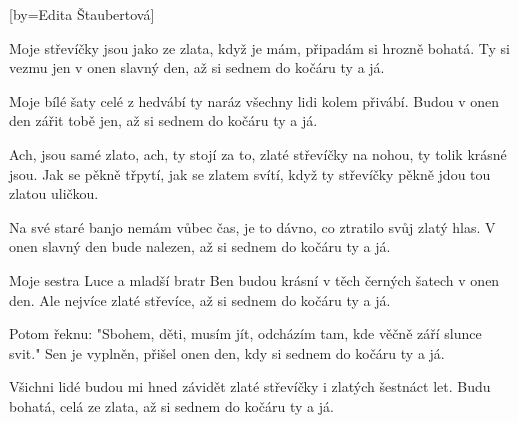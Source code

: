 [by={Edita Štaubertová}]

\beginverse{}
Moje střevíčky jsou jako ze zlata,
když je mám, připadám si hrozně bohatá.
Ty si vezmu jen v onen slavný den,
až si sednem do kočáru ty a já.
\endverse{}

\beginverse{}
Moje bílé šaty celé z hedvábí
ty naráz všechny lidi kolem přivábí.
Budou v onen den zářit tobě jen,
až si sednem do kočáru ty a já.
\endverse{}

\beginchorus{}
Ach, jsou samé zlato, ach, ty stojí za to,
zlaté střevíčky na nohou, ty tolik krásné jsou.
Jak se pěkně třpytí, jak se zlatem svítí,
když ty střevíčky pěkně jdou
tou zlatou uličkou.   
\endchorus{}

\beginverse{}
Na své staré banjo nemám vůbec čas,
je to dávno, co ztratilo svůj zlatý hlas.
V onen slavný den bude nalezen,
až si sednem do kočáru ty a já.
\endverse{}

\beginverse{}
Moje sestra Luce a mladší bratr Ben
budou krásní v těch černých šatech v onen den.
Ale nejvíce zlaté střevíce,
až si sednem do kočáru ty a já.
\endverse{}

\beginchorus{}
\phantom{}
\endchorus{}

\beginverse{}
Potom řeknu: "Sbohem, děti, musím jít,
odcházím tam, kde věčně září slunce svit."
Sen je vyplněn, přišel onen den,
kdy si sednem do kočáru ty a já.
\endverse{}

\beginverse{}
Všichni lidé budou mi hned závidět
zlaté střevíčky i zlatých šestnáct let.
Budu bohatá, celá ze zlata,
až si sednem do kočáru ty a já.
\endverse{}

\beginchorus{}
\phantom{}
\endchorus{}

\endsong{}
